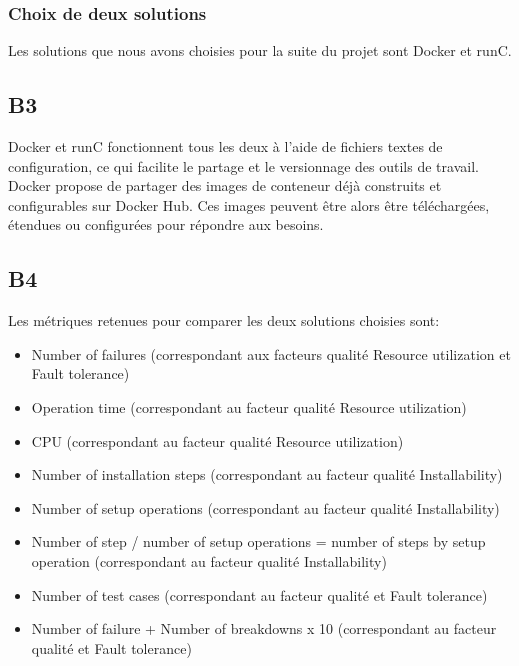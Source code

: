     \subsubsection*{Choix de deux solutions}
    Les solutions que nous avons choisies pour la suite du projet sont Docker et runC.

\subsection*{B3}
    Docker et runC fonctionnent tous les deux à l'aide de fichiers textes de configuration, ce qui facilite le partage et le versionnage des outils de travail. Docker propose de partager des images de conteneur déjà construits et configurables sur Docker Hub. Ces images peuvent être alors être téléchargées, étendues ou configurées pour répondre aux besoins.


\subsection*{B4}
    Les métriques retenues pour comparer les deux solutions choisies sont:
    \begin{itemize}
        \item Number of failures (correspondant aux facteurs qualité Resource utilization et Fault tolerance)
        \item Operation time (correspondant au facteur qualité Resource utilization)
        \item CPU (correspondant au facteur qualité Resource utilization)
        \item Number of installation steps (correspondant au facteur qualité Installability)
        \item Number of setup operations (correspondant au facteur qualité Installability)
        \item Number of step / number of setup operations = number of steps by setup operation (correspondant au facteur qualité Installability)
        \item Number of test cases (correspondant au facteur qualité et Fault tolerance)
        \item Number of failure + Number of breakdowns x 10 (correspondant au facteur qualité et Fault tolerance)
    \end{itemize}